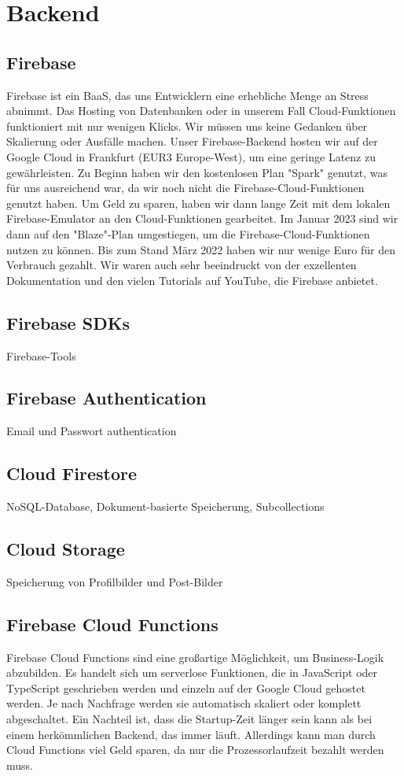 \section{Backend}

\subsection{Firebase}
\author{Martin Hausleitner}
Firebase ist ein BaaS, das uns Entwicklern eine erhebliche Menge an Stress abnimmt. Das Hosting von Datenbanken oder in unserem Fall Cloud-Funktionen funktioniert mit nur wenigen Klicks. Wir müssen uns keine Gedanken über Skalierung oder Ausfälle machen. Unser Firebase-Backend hosten wir auf der Google Cloud in Frankfurt (EUR3 Europe-West), um eine geringe Latenz zu gewährleisten. Zu Beginn haben wir den kostenlosen Plan "Spark" genutzt, was für uns ausreichend war, da wir noch nicht die Firebase-Cloud-Funktionen genutzt haben. Um Geld zu sparen, haben wir dann lange Zeit mit dem lokalen Firebase-Emulator an den Cloud-Funktionen gearbeitet. Im Januar 2023 sind wir dann auf den "Blaze"-Plan umgestiegen, um die Firebase-Cloud-Funktionen nutzen zu können. Bis zum Stand März 2022 haben wir nur wenige Euro für den Verbrauch gezahlt. Wir waren auch sehr beeindruckt von der exzellenten Dokumentation und den vielen Tutorials auf YouTube, die Firebase anbietet.


\subsection{Firebase SDKs}
\author{Sandin Habibovic}
Firebase-Tools

\subsection{Firebase Authentication}
\author{Sandin Habibovic}
Email und Passwort authentication

\subsection{Cloud Firestore}
\author{Sandin Habibovic}
NoSQL-Database, Dokument-basierte Speicherung, Subcollections
\subsection{Cloud Storage}
\author{Sandin Habibovic}
Speicherung von Profilbilder und Post-Bilder
\subsection{Firebase Cloud Functions}
\author{Martin Hausleitner}
Firebase Cloud Functions sind eine großartige Möglichkeit,
um Business-Logik abzubilden. Es handelt sich um serverlose
Funktionen, die in JavaScript oder TypeScript geschrieben
werden und einzeln auf der Google Cloud gehostet werden. Je
nach Nachfrage werden sie automatisch skaliert oder komplett
abgeschaltet. Ein Nachteil ist, dass die Startup-Zeit länger
sein kann als bei einem herkömmlichen Backend, das immer
läuft. Allerdings kann man durch Cloud Functions viel Geld
sparen, da nur die Prozessorlaufzeit bezahlt werden muss.

